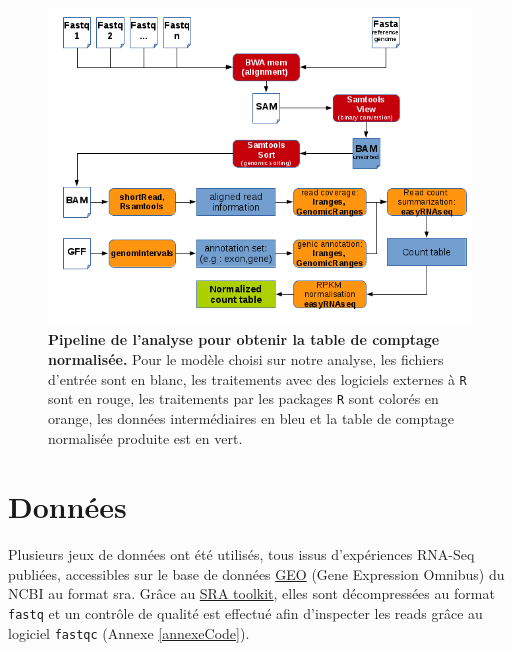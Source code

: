 \documentclass[12pt,a4paper]{report}
\begin{document}
\begin{onehalfspace}
\begin{figure}[h!]
\centerline{\includegraphics[scale=0.9]{figures/data_preparation.png}}
\caption{\textbf{Pipeline de l'analyse pour obtenir la table de comptage normalisée.} Pour le modèle choisi sur notre analyse, les fichiers d'entrée sont en blanc, les traitements avec des logiciels externes à \texttt{R} sont en rouge, les traitements par les packages \texttt{R} sont colorés en orange, les données intermédiaires en bleu et la table de comptage normalisée produite est en vert.}
\label{fig:data_preparation} 
\end{figure}

\section*{Données}
Plusieurs jeux de données ont été utilisés, tous issus d'expériences RNA-Seq publiées, accessibles sur le base de données \href{http://www.ncbi.nlm.nih.gov/geo/}{GEO} (Gene Expression Omnibus) du NCBI au format \gls{sra}. Grâce au \href{http://www.ncbi.nlm.nih.gov/books/NBK158900/#SRA_download.how_do_i_use_the_sra_toolki}{SRA toolkit}, elles sont décompressées au format \texttt{fastq} et un contrôle de qualité est effectué afin d'inspecter les \gls{reads} grâce au logiciel \texttt{fastqc} (Annexe \ref{annexeCode}).


\end{onehalfspace}
\end{document}
